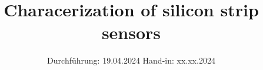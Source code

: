 

\subject{V15}
\title{Characerization of silicon strip sensors}
\date{%
  Durchführung: 19.04.2024
  \hspace{3em}
  Hand-in: xx.xx.2024
}



\maketitle
\thispagestyle{empty}
\tableofcontents
\newpage






\printbibliography{}


